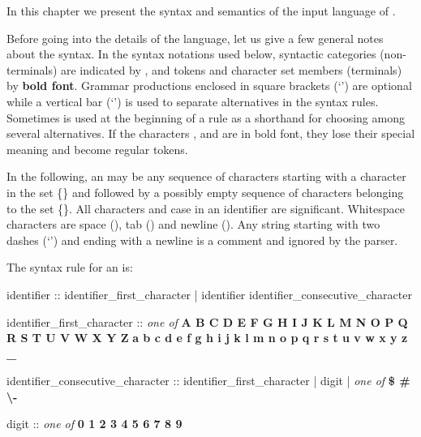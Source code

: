 
In this chapter we present the syntax and semantics of the input
language of \nusmv.

Before going into the details of the language, let us give a few general
notes about the syntax.
%
In the syntax notations used below, syntactic categories
(non-terminals) are indicated by , and tokens
and character set members (terminals) by \textbf{bold font}.
%
Grammar productions enclosed in square brackets (`\grammar{[]}') are
optional while a vertical bar (`\grammar{|}') is used to separate
alternatives in the syntax rules. Sometimes  is used
at the beginning of a rule as a shorthand for choosing among several
alternatives.
%
If the characters \grammar{\textbf{|}}, \grammar{\textbf{[}} and
\grammar{\textbf{]}} are in bold font, they lose their special
meaning and become regular tokens.

In the following, an  may be any sequence of
characters starting with a character in the set
\{{}\}
%
and followed by a possibly empty sequence of characters belonging to
the set
%
\{{}\}.
%
All characters and case in an identifier are significant. Whitespace
characters are space (\spc), tab (\tab) and newline (\ret).
%
Any string  starting with two
dashes (`\code{--}') and ending with a newline is a comment and
ignored by the parser.

The syntax rule for an  is:

\begin{Grammar}
identifier :: 
        identifier_first_character
      | identifier identifier_consecutive_character

identifier_first_character :: \emph{one of}
        \textbf{A B C D E F G H I J K L M N O P Q R S T U V W X Y Z}
        \textbf{a b c d e f g h i j k l m n o p q r s t u v w x y z _}

identifier_consecutive_character :: 
        identifier_first_character
      | digit
      | \emph{one of} \textbf{\$ \# \textbackslash -}

digit :: \emph{one of} \textbf{0 1 2 3 4 5 6 7 8 9}
\end{Grammar}

